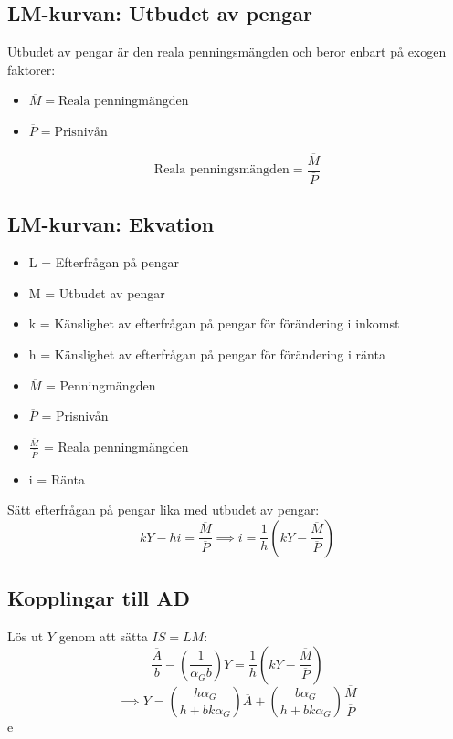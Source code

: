 \documentclass[12pt,a4paper]{article}
\begin{document}
\subsection*{LM-kurvan: Utbudet av pengar}
Utbudet av pengar är den reala penningsmängden och beror enbart på exogen faktorer:
\begin{itemize}
    \item $\overline{M} = \text{Reala penningmängden}$
    \item $\overline{P} = \text{Prisnivån}$
\end{itemize}

$$\text{Reala penningsmängden} = \frac{\overline{M}}{\overline{P}}$$

\subsection*{LM-kurvan: Ekvation}
\begin{itemize}
    \item L = Efterfrågan på pengar
    \item M = Utbudet av pengar
    \item k = Känslighet av efterfrågan på pengar för förändering i inkomst
    \item h = Känslighet av efterfrågan på pengar för förändering i ränta
    \item $\overline{M}$ = Penningmängden
    \item $\overline{P}$ = Prisnivån
    \item $\frac{\overline{M}}{\overline{P}}$ = Reala penningmängden
    \item i = Ränta
\end{itemize}
Sätt efterfrågan på pengar lika med utbudet av pengar:
$$kY - hi = \frac{\overline{M}}{\overline{P}} \implies i = \frac{1}{h}(kY - \frac{\overline{M}}{\overline{P}})$$

\subsection*{Kopplingar till AD}
Lös ut $Y$ genom att sätta $IS = LM$:
$$\frac{\overline{A}}{b} - (\frac{1}{\alpha_G b})Y = \frac{1}{h}(kY - \frac{\overline{M}}{\overline{P}})$$
$$\implies Y = (\frac{h \alpha_G}{h + bk\alpha_G})\overline{A} + (\frac{b \alpha_G}{h + bk\alpha_G})\frac{\overline{M}}{\overline{P}}$$e
\end{document}
